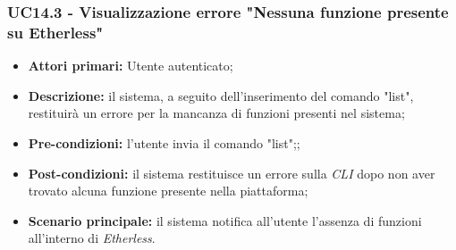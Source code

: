 \subsubsection{UC14.3 - Visualizzazione errore "Nessuna funzione presente su Etherless\glos"}
\begin{itemize}
	\item \textbf{Attori primari:} Utente autenticato;
	\item \textbf{Descrizione:} il sistema, a seguito dell'inserimento del comando "list", restituirà un errore per la mancanza di funzioni presenti nel sistema;
	\item \textbf{Pre-condizioni:} l'utente invia il comando "list";;
	\item \textbf{Post-condizioni:} il sistema restituisce un errore sulla \textit{CLI\glo} dopo non aver trovato alcuna funzione presente nella piattaforma;
	\item \textbf{Scenario principale:} il sistema notifica all'utente l'assenza di funzioni all'interno di \textit{Etherless\glos}.
\end{itemize}
